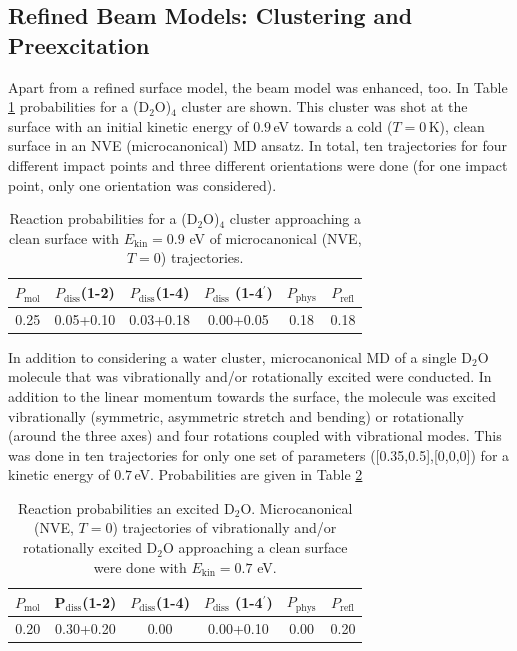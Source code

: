 \documentclass[11pt,DIV=13,BCOR=5mm,a4paper,headinclude]{scrbook}
\begin{document}
%
\subsection{Refined Beam Models: Clustering and Preexcitation}
Apart from a refined surface model, the beam model was enhanced, too.
In Table \ref{tab:4D2O-cluster} probabilities for a (D$_2$O)$_4$ cluster are shown.
This cluster was shot at the surface with an initial kinetic energy of $0.9\,$eV towards a cold ($T=0\,$K), clean surface in an NVE (microcanonical) MD ansatz.
In total, ten trajectories for four different impact points and three different orientations were done (for one impact point, only one orientation was considered).

\begin{table}[hbt]
 \centering
  \caption{Reaction probabilities for a (D$_2$O)$_4$ cluster approaching a clean surface with $E_\textrm{kin}=0.9$ eV of microcanonical (NVE, $T=0$) trajectories.}
 \begin{tabular}{cccccc}
\toprule
$P_\textrm{mol}$ & $P_\textrm{diss}$(1-2) &  $P_\textrm{diss}$(1-4) & $P_\textrm{diss}$ (1-4$^\prime$) & $P_\textrm{phys}$ & $P_\textrm{refl}$ \\\hline
0.25&0.05+0.10 &0.03+0.18 &0.00+0.05 &0.18 &0.18\\
\hline
\end{tabular}
 \label{tab:4D2O-cluster}
\end{table}

In addition to considering a water cluster, microcanonical MD of a single D$_2$O molecule that was vibrationally and/or rotationally excited were conducted.
In addition to the linear momentum towards the surface, the molecule was excited vibrationally (symmetric, asymmetric stretch and bending) or rotationally (around the three axes) and four rotations coupled with vibrational modes.
This was done in ten trajectories for only one set of parameters ([0.35,0.5],[0,0,0]) for a kinetic energy of $0.7\,$eV.
Probabilities are given in Table \ref{tab:vib-rot_exc}
\begin{table}[!h]
 \centering
  \caption{Reaction probabilities an excited D$_2$O.
Microcanonical (NVE, $T=0$) trajectories of vibrationally and/or rotationally excited D$_2$O approaching a clean surface were done with $E_\textrm{kin}=0.7$ eV.}
 \begin{tabular}{cccccc}
\toprule
$P_\textrm{mol}$ & P$_\textrm{diss}$(1-2) &  $P_\textrm{diss}$(1-4) & $P_\textrm{diss}$ (1-4$^\prime$) & $P_\textrm{phys}$ & $P_\textrm{refl}$ \\\midrule
0.20&0.30+0.20 & 0.00 &0.00+0.10 &0.00 &0.20\\
\bottomrule
\end{tabular}
 \label{tab:vib-rot_exc}
\end{table}
\end{document}
